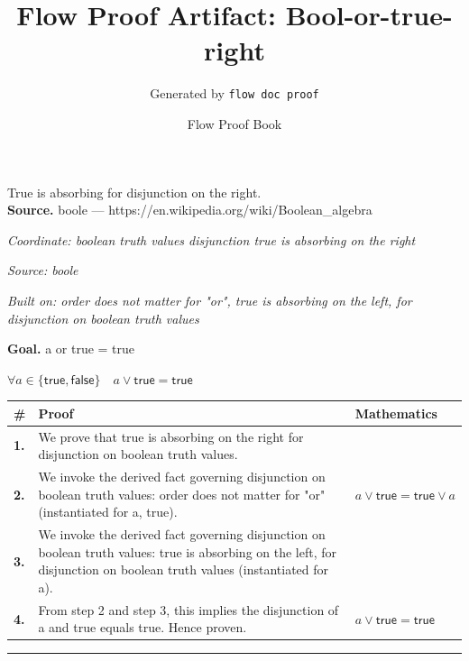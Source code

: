 \documentclass[11pt]{article}
\title{Flow Proof Artifact: Bool-or-true-right}
\author{Generated by \texttt{flow doc proof}}
\date{Flow Proof Book}
\theoremstyle{definition}
\begin{document}
\maketitle
True is absorbing for disjunction on the right.\\[0.5em]
\textbf{Source.} boole — https://en.wikipedia.org/wiki/Boolean\_algebra\\[0.5em]
\bigskip
{}\par
\smallskip\noindent\textit{Coordinate: boolean truth values \cdot disjunction \cdot true is absorbing on the right}\par
\smallskip\noindent\textit{Source: boole}\par
\smallskip\noindent\textit{Built on: order does not matter for "or", true is absorbing on the left, for disjunction on boolean truth values}\par
\medskip
\noindent\textbf{Goal.} a or true = true\par
\noindent$\displaystyle \forall a \in \{\mathsf{true}, \mathsf{false}\}\quad a \lor \mathsf{true} = \mathsf{true}$\par
\medskip
\noindent
\begin{tabular}{@{} >{\raggedright\arraybackslash}p{} >{\raggedright\arraybackslash}p{} >{\raggedleft\arraybackslash}p{} @{}}
\textbf{\#} & \textbf{Proof} & \textbf{Mathematics} \\
\midrule
\textbf{1.} & We prove that true is absorbing on the right for disjunction on boolean truth values. & \\[0.45em]
\textbf{2.} & We invoke the derived fact governing disjunction on boolean truth values: order does not matter for "or" (instantiated for a, true). & $\displaystyle a \lor \mathsf{true} = \mathsf{true} \lor a$ \\[0.45em]
\textbf{3.} & We invoke the derived fact governing disjunction on boolean truth values: true is absorbing on the left, for disjunction on boolean truth values (instantiated for a). & \\[0.45em]
\textbf{4.} & From step 2 and step 3, this implies the disjunction of a and true equals true. Hence proven. & $\displaystyle a \lor \mathsf{true} = \mathsf{true}$ \\[0.45em]
\bottomrule
\end{tabular}
\label{thm:Bool-disjunction-true_is_absorbing_on_the_right}
\par\medskip\hrule
\end{document}

